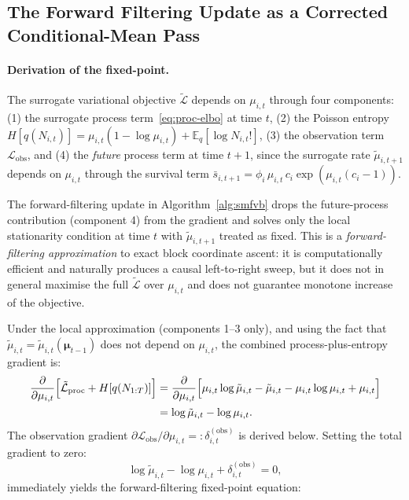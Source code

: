 \documentclass[review,12pt]{elsarticle}
\theoremstyle{definition}
\begin{document}
\subsection{The Forward Filtering Update as a Corrected Conditional-Mean Pass}
\label{sec:cavi-update}

\paragraph{Derivation of the fixed-point.}
The surrogate variational objective $\tilde{\mathcal{L}}$ depends on $\mu_{i,t}$ through
four components: (1) the surrogate process term~\eqref{eq:proc-elbo} at time $t$,
(2) the Poisson entropy $H[q(N_{i,t})]=\mu_{i,t}(1-\log\mu_{i,t})+\mathbb{E}_q[\log N_{i,t}!]$,
(3) the observation term $\mathcal{L}_\mathrm{obs}$, and
(4) the \emph{future} process term at time $t+1$, since the surrogate rate
$\tilde\mu_{i,t+1}$ depends on $\mu_{i,t}$ through the survival term
$\bar{s}_{i,t+1}=\phi_i\,\mu_{i,t}\,c_i\exp(\mu_{i,t}(c_i-1))$.

The forward-filtering update in Algorithm~\ref{alg:smfvb} drops the
future-process contribution (component 4) from the gradient and solves only
the local stationarity condition at time $t$ with $\tilde\mu_{i,t+1}$
treated as fixed.  This is a \emph{forward-filtering approximation} to exact
block coordinate ascent: it is computationally efficient and naturally produces
a causal left-to-right sweep, but it does not in general maximise the full
$\tilde{\mathcal{L}}$ over $\mu_{i,t}$ and does not guarantee monotone
increase of the objective.

Under the local approximation (components 1--3 only), and using the fact
that $\tilde\mu_{i,t}=\tilde\mu_{i,t}(\boldsymbol{\mu}_{t-1})$ does not
depend on $\mu_{i,t}$, the combined process-plus-entropy gradient is:
\begin{align}
\frac{\partial}{\partial\mu_{i,t}}
\Bigl[\tilde{\mathcal{L}}_\mathrm{proc}+H[q(N_{1:T})]\Bigr]
&=\frac{\partial}{\partial\mu_{i,t}}
  \Bigl[\mu_{i,t}\log\tilde\mu_{i,t}-\tilde\mu_{i,t}
        -\mu_{i,t}\log\mu_{i,t}+\mu_{i,t}\Bigr]\notag\\
&=\log\tilde\mu_{i,t}-\log\mu_{i,t}.\label{eq:proc-entropy-grad}
\end{align}
The observation gradient
$\partial\mathcal{L}_\mathrm{obs}/\partial\mu_{i,t}
 =:\delta_{i,t}^{(\mathrm{obs})}$ is derived below.
Setting the total gradient to zero:
\[
\log\tilde\mu_{i,t}-\log\mu_{i,t}+\delta_{i,t}^{(\mathrm{obs})}=0,
\]
immediately yields the forward-filtering fixed-point equation:
\end{document}
